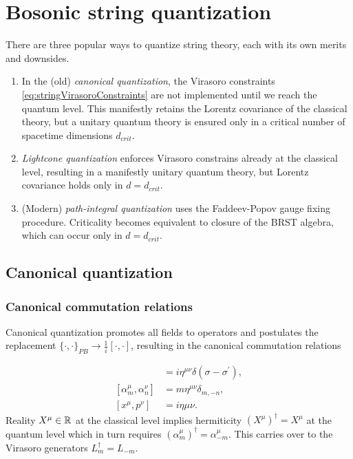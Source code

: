 \section{Bosonic string quantization}
There are three popular ways to quantize string theory, each with its own merits and downsides.
\begin{enumerate}
	\item In the (old) \emph{canonical quantization}, the Virasoro constraints \ref{eq:stringVirasoroConstraints} are not implemented until we reach the quantum level. This manifestly retains the Lorentz covariance of the classical theory, but a unitary quantum theory is ensured only in a critical number of spacetime dimensions $d_{crit}$.
	\item \emph{Lightcone quantization} enforces Virasoro constrains already at the classical level, resulting in a manifestly unitary quantum theory, but Lorentz covariance holds only in $d = d_{crit}$.
	\item (Modern) \emph{path-integral quantization} uses the Faddeev-Popov gauge fixing procedure. Criticality becomes equivalent to closure of the BRST algebra, which can occur only in $d=d_{crit}$.
\end{enumerate}
\subsection{Canonical quantization}
\subsubsection{Canonical commutation relations}
Canonical quantization promotes all fields to operators and postulates the replacement $\{\cdot,\cdot \}_{PB}\rightarrow \frac{1}{i} [\cdot,\cdot]$, resulting in the canonical commutation relations

\begin{align*}
	[X^\mu(\tau,\sigma),\Pi^\nu (\tau,\sigma^\prime)] &= i \eta^{\mu \nu} \delta(\sigma-\sigma^\prime),\\
	[\alpha^\mu_m,\alpha^\nu_n] &= m \eta^{\mu \nu} \delta_{m,-n}, \\
	[x^\mu,p^\nu] &= i \eta{ \mu \nu}.
\end{align*}
Reality $X^\mu \in \mathbb{R}$ at the classical level implies hermiticity $(X^\mu)^\dagger = X^\mu$ at the quantum level which in turn requires $(\alpha^\mu_m)^\dagger=\alpha^\mu_{-m}$. This carries over to the Virasoro generators $L^\dagger_m= L_{-m}$.


